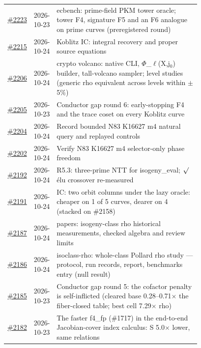 {\begin{longtable}{@{}r l >{\raggedright\arraybackslash}p{0.78\linewidth}@{}}
\href{https://github.com/aburan28/crypto/pull/2223}{\#2223} & 2026-10-23 & ecbench: prime-field PKM tower oracle; tower F4, signature F5 and an F6 analogue on prime curves (preregistered round)\\
\href{https://github.com/aburan28/crypto/pull/2215}{\#2215} & 2026-10-24 & Koblitz IC: integral recovery and proper source equations\\
\href{https://github.com/aburan28/crypto/pull/2206}{\#2206} & 2026-10-24 & crypto volcano: native CLI, $\Phi$\_\allowbreak{}$\ell$(X,j$_0$) builder, tall-volcano sampler; level studies (generic rho equivalent across levels within $\pm$5\%)\\
\href{https://github.com/aburan28/crypto/pull/2205}{\#2205} & 2026-10-23 & Conductor gap round 6: early-stopping F4 and the trace coset on every Koblitz curve\\
\href{https://github.com/aburan28/crypto/pull/2204}{\#2204} & 2026-10-24 & Record bounded N83 K16627 m4 natural query and replayed controls\\
\href{https://github.com/aburan28/crypto/pull/2202}{\#2202} & 2026-10-24 & Verify N83 K16627 m4 selector-only phase freedom\\
\href{https://github.com/aburan28/crypto/pull/2192}{\#2192} & 2026-10-24 & R5.3: three-prime NTT for isogeny\_\allowbreak{}eval; $\surd$\'elu crossover re-measured\\
\href{https://github.com/aburan28/crypto/pull/2191}{\#2191} & 2026-10-24 & IC: two orbit columns under the lazy oracle: cheaper on 1 of 5 curves, dearer on 4 (stacked on \#2158)\\
\href{https://github.com/aburan28/crypto/pull/2187}{\#2187} & 2026-10-24 & papers: isogeny-class rho historical measurements, checked algebra and review limits\\
\href{https://github.com/aburan28/crypto/pull/2186}{\#2186} & 2026-10-24 & isoclass-rho: whole-class Pollard rho study --- protocol, run records, report, benchmarks entry (null result)\\
\href{https://github.com/aburan28/crypto/pull/2185}{\#2185} & 2026-10-23 & Conductor gap round 5: the cofactor penalty is self-inflicted (cleared base 0.28--0.71$\times$ the fiber-closed table; best cell 7.29$\times$ rho)\\
\href{https://github.com/aburan28/crypto/pull/2182}{\#2182} & 2026-10-23 & The faster f4\_\allowbreak{}fp (\#1717) in the end-to-end Jacobian-cover index calculus: S 5.0$\times$ lower, same relations\\

\end{longtable}}
